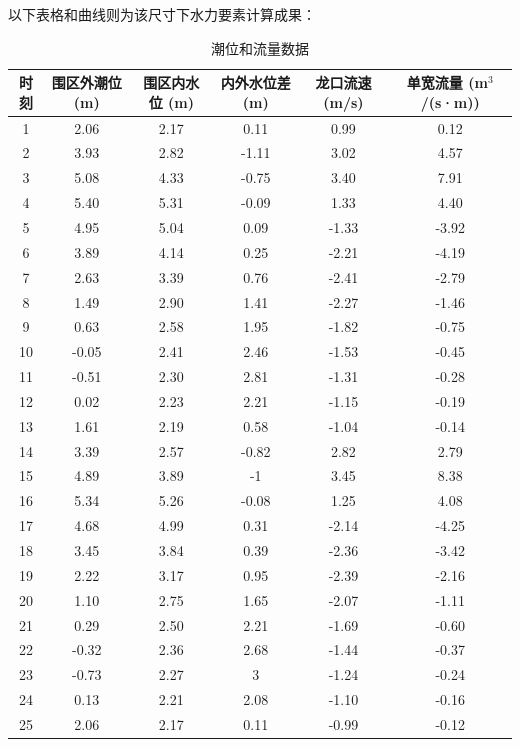 \documentclass[UTF8, a4paper, 12pt]{ctexart} %
\begin{document}
以下表格和曲线则为该尺寸下水力要素计算成果：


\begin{table}[h!]
\centering
\caption{潮位和流量数据}
\begin{tabular}{cccccc}
\toprule
时刻 & 围区外潮位 (m) & 围区内水位 (m) & 内外水位差 (m) & 龙口流速 (m/s) & 单宽流量 (m$^3$/(s·m)) \\
\midrule
1 & 2.06 & 2.17 & 0.11 & 0.99 & 0.12 \\
2 & 3.93 & 2.82 & -1.11 & 3.02 & 4.57 \\
3 & 5.08 & 4.33 & -0.75 & 3.40 & 7.91 \\
4 & 5.40 & 5.31 & -0.09 & 1.33 & 4.40 \\
5 & 4.95 & 5.04 & 0.09 & -1.33 & -3.92 \\
6 & 3.89 & 4.14 & 0.25 & -2.21 & -4.19 \\
7 & 2.63 & 3.39 & 0.76 & -2.41 & -2.79 \\
8 & 1.49 & 2.90 & 1.41 & -2.27 & -1.46 \\
9 & 0.63 & 2.58 & 1.95 & -1.82 & -0.75 \\
10 & -0.05 & 2.41 & 2.46 & -1.53 & -0.45 \\
11 & -0.51 & 2.30 & 2.81 & -1.31 & -0.28 \\
12 & 0.02 & 2.23 & 2.21 & -1.15 & -0.19 \\
13 & 1.61 & 2.19 & 0.58 & -1.04 & -0.14 \\
14 & 3.39 & 2.57 & -0.82 & 2.82 & 2.79 \\
15 & 4.89 & 3.89 & -1 & 3.45 & 8.38 \\
16 & 5.34 & 5.26 & -0.08 & 1.25 & 4.08 \\
17 & 4.68 & 4.99 & 0.31 & -2.14 & -4.25 \\
18 & 3.45 & 3.84 & 0.39 & -2.36 & -3.42 \\
19 & 2.22 & 3.17 & 0.95 & -2.39 & -2.16 \\
20 & 1.10 & 2.75 & 1.65 & -2.07 & -1.11 \\
21 & 0.29 & 2.50 & 2.21 & -1.69 & -0.60 \\
22 & -0.32 & 2.36 & 2.68 & -1.44 & -0.37 \\
23 & -0.73 & 2.27 & 3 & -1.24 & -0.24 \\
24 & 0.13 & 2.21 & 2.08 & -1.10 & -0.16 \\
25 & 2.06 & 2.17 & 0.11 & -0.99 & -0.12 \\
\bottomrule
\end{tabular}
\end{table}
\end{document}

